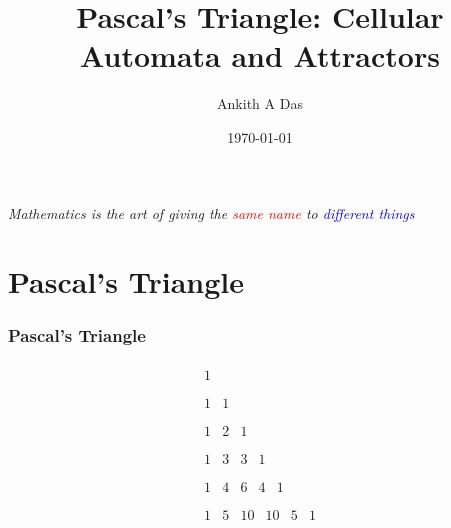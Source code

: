\documentclass{beamer}
\title{Pascal's Triangle: Cellular Automata and Attractors}
\author{Ankith A Das}
\institute{The University of Sydney}
\date{\today}
\begin{document}
\frame{\titlepage}
\begin{frame}
    \textit{Mathematics is the art of giving the \textcolor{red}{same name} to \textcolor{blue}{different things}}
\\[5pt]
\end{frame}
\section[Outline]{}
\frame{\tableofcontents}

\section{Pascal's Triangle}
\begin{frame}
    \frametitle{Pascal's Triangle}
    \begin{equation*}
        \begin{array}{c}
            \begin{array}{c}
             1 \\
            \end{array}
             \\
            \begin{array}{cc}
             1 & 1 \\
            \end{array}
             \\
            \begin{array}{ccc}
             1 & 2 & 1 \\
            \end{array}
             \\
            \begin{array}{cccc}
             1 & 3 & 3 & 1 \\
            \end{array}
             \\
            \begin{array}{ccccc}
             1 & 4 & 6 & 4 & 1 \\
            \end{array}
             \\
            \begin{array}{cccccc}
             1 & 5 & 10 & 10 & 5 & 1 \\
            \end{array}
             \\
            \begin{array}{ccccccc}

\end{array}
\end{array}
\end{equation*}
\end{frame}
\end{document}
